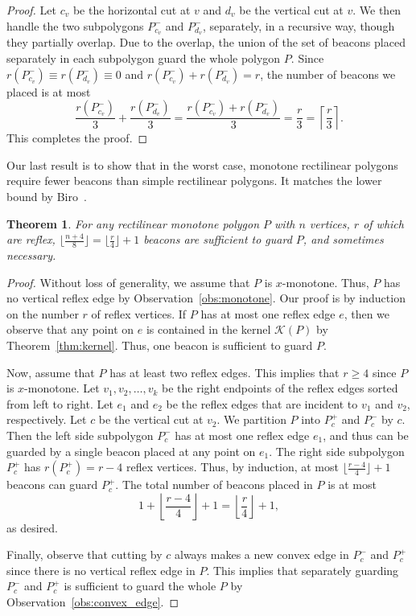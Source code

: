 \documentclass[11pt]{article}
\newcommand{\Kernel}{\mathcal{K}}
\newtheorem{theorem}{Theorem}
\theoremstyle{definition}
\let\geq\geqslant
\begin{document}
\begin{proof}
Let $c_v$ be the horizontal cut at $v$ and $d_v$ be the vertical cut at $v$.
We then handle  the two subpolygons $P^-_{c_v}$ and $P^-_{d_v}$, separately, in a recursive way,
though they partially overlap.
Due to the overlap, the union of the set of beacons placed separately in each subpolygon
guard the whole polygon $P$.
Since $r(P^-_{c_v}) \equiv r(P^-_{d_v}) \equiv 0$ and
$r(P^-_{c_v}) + r(P^-_{d_v}) = r$,
the number of beacons we placed is at most
\[ \frac{r(P^-_{c_v})}{3}  + \frac{r(P^-_{d_v})}{3} = \frac{r(P^-_{c_v})+r(P^-_{d_v})}{3}  =
 \frac{r}{3} = \left\lceil \frac{r}{3} \right\rceil.\]
This completes the proof.
\end{proof}


Our last result is to show that in the worst case, monotone rectilinear polygons require fewer
beacons than simple rectilinear polygons. It matches the lower bound by Biro~\cite{b-bbrg-13}.
\begin{theorem}\label{thm:coverage_monotone}
 For any rectilinear monotone polygon $P$ with $n$ vertices, $r$ of which are reflex,
 $\lfloor \frac{n+4}{8} \rfloor = \lfloor \frac{r}{4} \rfloor + 1$ beacons are sufficient to guard $P$,
 and sometimes necessary.
\end{theorem}
\begin{proof}
Without loss of generality, we assume that $P$ is $x$-monotone.
Thus, $P$ has no vertical reflex edge by Observation~\ref{obs:monotone}.
Our proof is by induction on the number $r$ of reflex vertices.
If $P$ has at most one reflex edge $e$,
then we observe that any point on $e$ is contained in the kernel $\Kernel(P)$
by Theorem~\ref{thm:kernel}.
Thus, one beacon is sufficient to guard $P$.

Now, assume that $P$ has at least two reflex edges.
This implies that $r \geq 4$ since $P$ is $x$-monotone.
Let $v_1, v_2, \ldots, v_k$ be the right endpoints of the reflex edges
sorted from left to right.
Let $e_1$ and $e_2$ be the reflex edges that are incident to $v_1$ and $v_2$, respectively.
Let $c$ be the vertical cut at $v_2$.
We partition $P$ into $P^+_c$ and $P^-_c$ by $c$.
Then the left side subpolygon $P^-_c$ has at most one reflex edge $e_1$,
and thus can be guarded by a single beacon placed at any point on $e_1$.
The right side subpolygon $P^+_c$ has $r(P^+_c) = r - 4$ reflex vertices.
Thus, by induction, at most $\lfloor \frac{r-4}{4} \rfloor + 1$ beacons
can guard $P^+_c$.
The total number of beacons placed in $P$ is at most
 \[ 1 + \left\lfloor \frac{r-4}{4} \right\rfloor + 1 = \left\lfloor \frac{r}{4} \right\rfloor + 1,\]
as desired.

Finally, observe that cutting by $c$ always makes a new convex edge in $P^-_c$ and $P^+_c$
since there is no vertical reflex edge in $P$.
This implies that separately guarding $P^-_c$ and $P^+_c$ is sufficient to guard the whole $P$
by Observation~\ref{obs:convex_edge}.
\end{proof}
\end{document}
